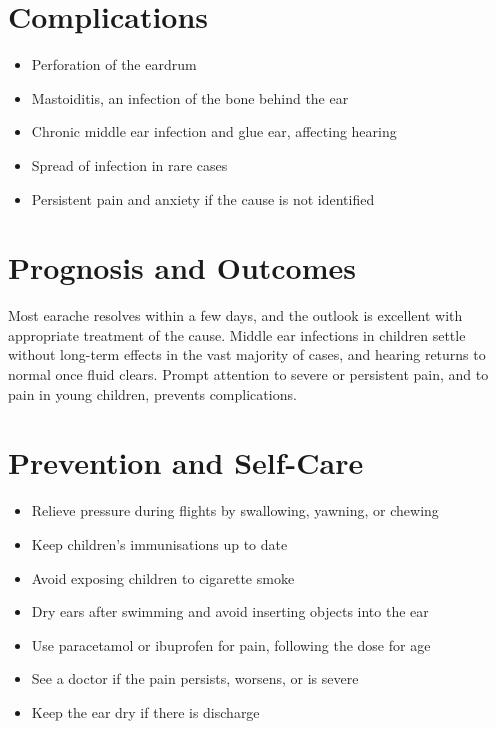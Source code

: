 \section*{Complications}
\begin{itemize}
    \item Perforation of the eardrum
    \item Mastoiditis, an infection of the bone behind the ear
    \item Chronic middle ear infection and glue ear, affecting hearing
    \item Spread of infection in rare cases
    \item Persistent pain and anxiety if the cause is not identified
\end{itemize}

\section*{Prognosis and Outcomes}
Most earache resolves within a few days, and the outlook is excellent with appropriate treatment of the cause. Middle ear infections in children settle without long-term effects in the vast majority of cases, and hearing returns to normal once fluid clears. Prompt attention to severe or persistent pain, and to pain in young children, prevents complications.

\section*{Prevention and Self-Care}
\begin{itemize}
    \item Relieve pressure during flights by swallowing, yawning, or chewing
    \item Keep children's immunisations up to date
    \item Avoid exposing children to cigarette smoke
    \item Dry ears after swimming and avoid inserting objects into the ear
    \item Use paracetamol or ibuprofen for pain, following the dose for age
    \item See a doctor if the pain persists, worsens, or is severe
    \item Keep the ear dry if there is discharge
\end{itemize}

